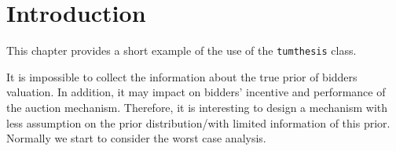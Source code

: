 \chapter{Introduction}
\label{ch:introduction}

This chapter provides a short example of the use of the \texttt{tumthesis} class.

It is impossible to collect the information about the true prior of bidders valuation. In addition, it may impact on bidders' incentive and performance of the auction mechanism. Therefore, it is interesting to design a mechanism with less assumption on the prior distribution/with limited information of this prior. Normally we start to consider the worst case analysis.





